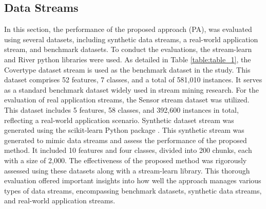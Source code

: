 \subsection{Data Streams}
\label{sec:data_stream}
In this section, the performance of the proposed approach (PA), was evaluated using several datasets, including synthetic data streams, a real-world application stream, and benchmark datasets. To conduct the evaluations, the stream-learn and River python libraries \cite{ksieniewicz2022stream} were used. As detailed in Table \ref{table:table_1}, the Covertype dataset stream is used as the benchmark dataset in the study. This dataset comprises 52 features, 7 classes, and a total of 581,010 instances. It serves as a standard benchmark dataset widely used in stream mining research. For the evaluation of real application streams, the Sensor stream dataset was utilized. This dataset includes 5 features, 58 classes, and 392,600 instances in total, reflecting a real-world application scenario. Synthetic dataset stream was generated using the scikit-learn Python package \cite{ksieniewicz2022stream}. This synthetic stream was generated to mimic data streams and assess the performance of the proposed method. It included 10 features and four classes, divided into 200 chunks, each with a size of 2,000. The effectiveness of the proposed method was rigorously assessed using these datasets along with a stream-learn library. This thorough evaluation offered important insights into how well the approach manages various types of data streams, encompassing benchmark datasets, synthetic data streams, and real-world application streams.

\begin{table}[t]
	\centering
  \caption{The datasets utilized in the experiments exhibited diverse characteristics.}

	\label{table:table_1}
	\end{table}

